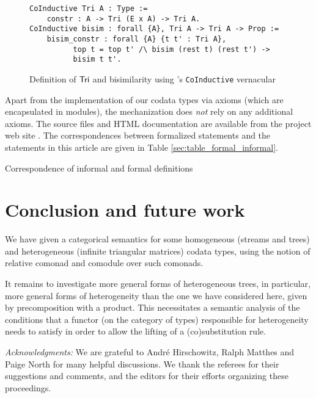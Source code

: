 \documentclass[a4paper,USenglish]{lipics}
\newcommand{\parencite}[1]{\cite{#1}}
\begin{document}
\begin{figure}
  \begin{lstlisting}
CoInductive Tri A : Type :=
    constr : A -> Tri (E x A) -> Tri A.
CoInductive bisim : forall {A}, Tri A -> Tri A -> Prop :=
    bisim_constr : forall {A} {t t' : Tri A}, 
          top t = top t' /\ bisim (rest t) (rest t') -> 
          bisim t t'.
\end{lstlisting}
 \caption{Definition of $\mathsf{Tri}$ and bisimilarity using \coq's \lstinline!CoInductive! vernacular} \label{tri_coinductive}
\end{figure}


Apart from the implementation of our codata types via axioms (which are encapsulated in modules), the mechanization does \emph{not} rely on any additional axioms.
The \coq source files and HTML documentation are available from the project web site \parencite{trimat_coq}.
The correspondences between formalized statements and the statements in this article are given in Table \ref{sec:table_formal_informal}.



\begin{table}[hbt]
 \begin{mdframed}
  
 \end{mdframed}
 \caption{Correspondence of informal and formal definitions} \label{sec:table_formal_informal}
\end{table}


\section{Conclusion and future work}

We have given a categorical semantics for some homogeneous (streams and trees) and heterogeneous (infinite triangular matrices) codata types,
using the notion of relative comonad and comodule over such comonads.

It remains to investigate more general forms of heterogeneous trees, in particular, more general forms of heterogeneity than the one we have
considered here, given by precomposition with a product.
This necessitates a semantic analysis of the conditions that a functor (on the category of types) responsible for heterogeneity needs to satisfy in order to allow the lifting of a (co)substitution rule.

 \textit{Acknowledgments:}
 We are grateful to André Hirschowitz, Ralph Matthes and Paige North for many helpful discussions.
 We thank the referees for their suggestions and comments, and the editors for their efforts organizing these proceedings.
 


\end{document}
